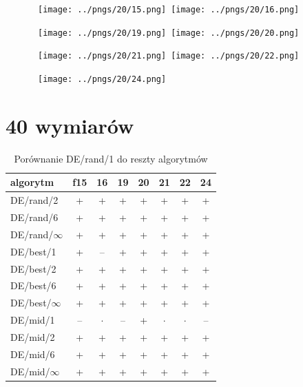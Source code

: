 \documentclass[a4paper,onecolumn,oneside,11pt,wide,floatssmall]{mwrep}
\theoremstyle{definition}
\theoremstyle{plain}%
\theoremstyle{remark}
\begin{document}
\begin{figure}[H]
\centering
\mbox{
\texttt{[image: ../pngs/20/15.png]} \quad
\texttt{[image: ../pngs/20/16.png]} 
}
\end{figure}

\begin{figure}[H]
\centering
\mbox{
\texttt{[image: ../pngs/20/19.png]} \quad
\texttt{[image: ../pngs/20/20.png]} 
}
\end{figure}

\begin{figure}[H]
\centering
\mbox{
\texttt{[image: ../pngs/20/21.png]} \quad
\texttt{[image: ../pngs/20/22.png]} 
}
\end{figure}

\begin{figure}[H]
\centering
\mbox{
\texttt{[image: ../pngs/20/24.png]} \quad
}
\end{figure}

\section{40 wymiarów}

\begin{table}[H]
\centering
\begin{tabular}{ l | c | c | c | c | c | c | c }
algorytm         &f15& 16& 19& 20& 21& 22& 24 \\ \hline
DE/rand/2	 & + & + & + & + & + & + & + \\
DE/rand/6	 & + & + & + & + & + & + & + \\
DE/rand/$\infty$	 & + & + & + & + & + & + & + \\
DE/best/1	 & + & -- & + & + & + & + & + \\
DE/best/2	 & + & + & + & + & + & + & + \\
DE/best/6	 & + & + & + & + & + & + & + \\
DE/best/$\infty$	 & + & + & + & + & + & + & + \\
DE/mid/1	 & -- & $\cdot$ & -- & + & $\cdot$ & $\cdot$ & -- \\
DE/mid/2	 & + & + & + & + & + & + & + \\
DE/mid/6	 & + & + & + & + & + & + & + \\
DE/mid/$\infty$	 & + & + & + & + & + & + & + \\
\end{tabular}
\caption{Porównanie DE/rand/1 do reszty algorytmów}
\end{table}
\end{document}
